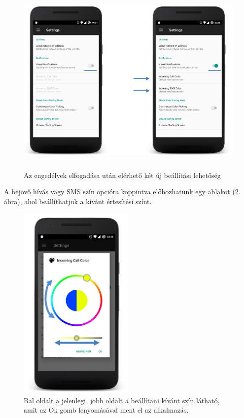 \documentclass[../main.tex]{subfiles}
\begin{document}
                \begin{figure}[!h]
                    \includegraphics[height=9.5cm]{android_res/screen_pictures/visual_notification_01.png}
                    \caption{Az engedélyek elfogadása után elérhető két új beállítási lehetőség}
                     \label{fig:vis_not_01}
                \end{figure}
                
                A bejövő hívás vagy SMS szín opcióra koppintva előhozhatunk egy ablakot (\ref{fig:vis_not_03}. ábra), ahol beállíthatjuk a kívánt értesítési színt. 
                
                \begin{figure}[!h]
                    \includegraphics[width=5.6cm]{android_res/screen_pictures/visual_notification_03.png}
                    \caption{Bal oldalt a jelenlegi, jobb oldalt a beállítani kívánt szín látható, amit az Ok gomb lenyomásával ment el az alkalmazás.}
                    \label{fig:vis_not_03}
                \end{figure}
\end{document}
